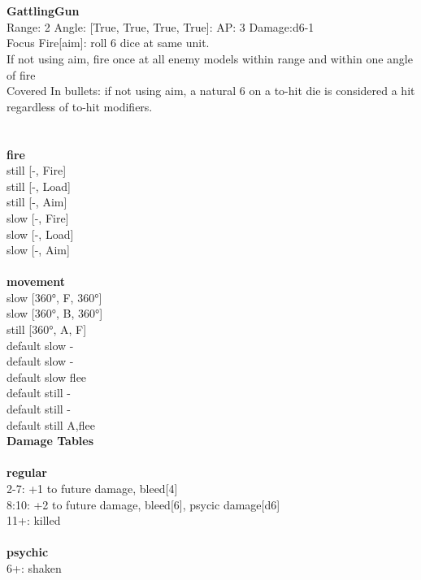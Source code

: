 \ \\

\ \\
{\bf GattlingGun } \\



Range: 2  Angle: [True, True, True, True]: AP: 3 Damage:d6-1 \\
Focus Fire[aim]: roll 6 dice at same unit.\\ 
If not using aim, fire once at all enemy models within range and within one angle of fire\\ 
Covered In bullets: if not using aim, a natural 6 on a to-hit die is considered a hit regardless of to-hit modifiers.\\ 




 
\ \\



\ \\ {\bf fire } \\
still [-, Fire] \\
still [-, Load] \\
still [-, Aim] \\
slow [-, Fire] \\
slow [-, Load] \\
slow [-, Aim] \\
\ \\ {\bf movement } \\
slow [360°, F, 360°] \\
slow [360°, B, 360°] \\
still [360°, A, F] \\
default slow - \\
default slow - \\
default slow flee \\
default still - \\
default still - \\
default still A,flee \\


{\bf Damage Tables} \\
\ \\ {\bf regular } \\
2-7: +1 to future damage, bleed[4] \\
8:10: +2 to future damage, bleed[6], psycic damage[d6] \\
11+: killed \\
\ \\ {\bf psychic } \\
6+: shaken \\










